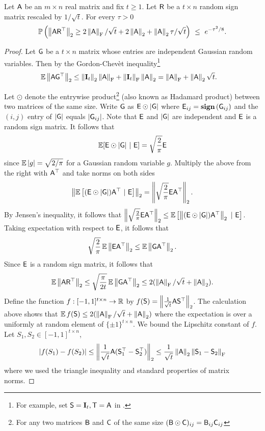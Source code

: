 \begin{lemma}\label{lem:Rudelson}
Let ${\mathsf{A} }$ be an $m\times n$ real matrix and fix $t\geq 1$. Let ${\mathsf{R} }$ be a $t\times n$ random sign matrix rescaled by $1/\sqrt{t}$. For every $\tau>0$
\begin{equation}
 \mathbb{P}\left( \left\| {\mathsf{A} }{\mathsf{R} }^\top \right\|_2 \geq 2\left\|{\mathsf{A} }\right\|_{\textrm{F}} / \sqrt{t} + 2 \left\|{\mathsf{A} }\right\|_2 + \left\|{\mathsf{A} }\right\|_2 \tau / \sqrt{t} \right)\ \leq\ e^{-\tau^2/8}.
\end{equation}
\end{lemma}
\begin{proof}
Let ${\mathsf{G} }$ be a $t\times n$ matrix whose entries are independent Gaussian random variables. Then by the Gordon-Chev\`{e}t inequality\footnote{For example, set ${\mathsf{S} }=\mathbf{I}_t, {\mathsf{T} }={\mathsf{A} }$ in \cite[Proposition~$10.1$,~p.~$54$]{HMT}.}
\begin{align*}
 	\operatorname{\mathbb{E}}\left\|{\mathsf{A} }{\mathsf{G} }^\top\right\|_2 	& \leq  \left\|\mathbf{I}_t\right\|_2\left\|{\mathsf{A} }\right\|_{\textrm{F}} + \left\|\mathbf{I}_t\right\|_{\textrm{F}}\left\|{\mathsf{A} }\right\|_2 =   \left\|{\mathsf{A} }\right\|_{\textrm{F}} + \left\|{\mathsf{A} }\right\|_2\sqrt{t}.
\end{align*}

Let $\odot$ denote the entrywise product\footnote{For any two matrices ${\mathsf{B} }$ and ${\mathsf{C} }$ of the same size $({\mathsf{B} } \odot {\ensuremath{\mathsf{C} }})_{ij} = {\mathsf{B} }_{ij}{\mathsf{C} }_{ij} $} (also known as Hadamard product) between two matrices of the same size. Write ${\mathsf{G} }$ as ${\mathsf{E} } \odot |{\mathsf{G} }|$ where ${\mathsf{E} }_{ij} = \operatorname{\textbf{sign}}\left({\mathsf{G} }_{ij}\right)$ and the $(i,j)$ entry of $|{\mathsf{G} }|$ equals $ |{\mathsf{G} }_{ij}|$. Note that ${\mathsf{E} }$ and $|{\mathsf{G} }|$ are independent and ${\mathsf{E} } $ is a random sign matrix. It follows that
\[\operatorname{\mathbb{E}}[ {\mathsf{E} }\odot |{\mathsf{G} }| \ |\ {\mathsf{E} }] = \sqrt{\frac{2}{\pi}} {\mathsf{E} }\]
since $\operatorname{\mathbb{E}} |g| = \sqrt{2/\pi}$ for a Gaussian random variable $g$. Multiply the above from the right with ${\mathsf{A} }^\top$ and take norms on both sides
\[\left\| \operatorname{\mathbb{E}}\left[ ({\mathsf{E} }\odot |{\mathsf{G} }|) {\mathsf{A} }^\top \ |\ {\mathsf{E} }\right]  \right\|_2= \left\|\sqrt{\frac{2}{\pi}} {\mathsf{E} } {\mathsf{A} }^\top\right\|_2.\]
By Jensen's inequality, it follows that $\left\|\sqrt{\frac{2}{\pi}} {\mathsf{E} } {\mathsf{A} }^\top\right\|_2 \leq \operatorname{\mathbb{E}} \left[ \left\|({\mathsf{E} }\odot |{\mathsf{G} }|) {\mathsf{A} }^\top \right\|_2 \ |\ {\mathsf{E} } \right] $. Taking expectation with respect to ${\mathsf{E} }$, it follows that
\[ \sqrt{\frac{2}{\pi}} \operatorname{\mathbb{E}} \left\| {\mathsf{E} } {\mathsf{A} }^\top \right\|_2 \leq \operatorname{\mathbb{E}} \left\|{\mathsf{G} } {\mathsf{A} }^\top \right\|_2.\]
Since ${\mathsf{E} }$ is a random sign matrix, it follows that
\[\operatorname{\mathbb{E}} \left\|{\mathsf{A} } {\mathsf{R} }^\top\right\|_2 \leq  \sqrt{\frac{\pi}{2t}} \operatorname{\mathbb{E}} \left\|{\mathsf{G} } {\mathsf{A} }^\top \right\|_2 \leq 2(\left\|{\mathsf{A} }\right\|_{\textrm{F}} /\sqrt{t} + \left\|{\mathsf{A} }\right\|_2).\]
%
%
%
Define the function $f:[-1,1]^{t\times n} \to \mathbb{R}$ by $f({\mathsf{S} }) = \left\|\frac1{\sqrt{t} } {\mathsf{A} }{\mathsf{S} }^\top\right\|_2$. The calculation above shows that $\operatorname{\mathbb{E}} f({\mathsf{S} })\leq 2(\left\|{\mathsf{A} }\right\|_{\textrm{F}}/\sqrt{t} + \left\|{\mathsf{A} }\right\|_2)$ where the expectation is over a uniformly at random element of $\{\pm 1\}^{t\times n}$. We bound the Lipschitz constant of $f$. Let $S_1, S_2 \in [-1,1]^{t\times n}$,
\[ |f(S_1) - f(S_2)| \leq \left\| \frac1{\sqrt{t}} {\mathsf{A} } ({\mathsf{S} }_1^\top - {\mathsf{S} }_2^\top )\right\|_2 \leq \frac1{\sqrt{t}} \left\|{\mathsf{A} }\right\|_2 \left\|{\mathsf{S} }_1 - {\mathsf{S} }_2\right\|_{\textrm{F}}\]
where we used the triangle inequality and standard properties of matrix norms.


\end{proof}
